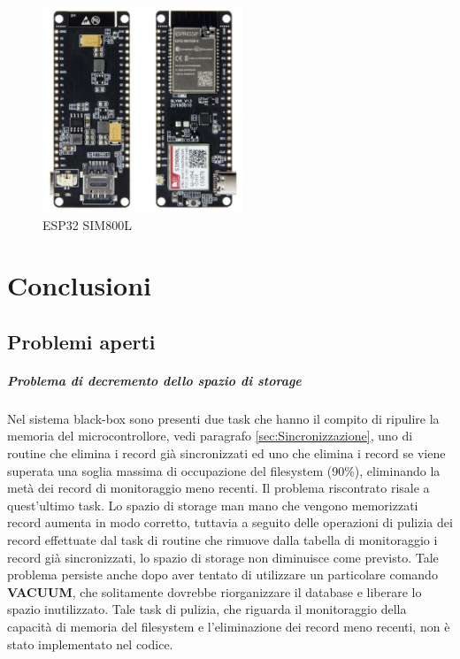 \documentclass[12pt, a4paper, italian]{report}
\numberwithin{figure}{chapter}
\numberwithin{table}{chapter}
\begin{document}
\begin{figure}[h]
  \centering
  \includegraphics[width=6cm]{esp32_gsm.png}
  \caption{ESP32 SIM800L}
  \label{fig:esp32_gsm}
\end{figure}

\chapter{Conclusioni}
\section{Problemi aperti}
\paragraph{Problema di decremento dello spazio di storage}
Nel sistema black-box sono presenti due task che hanno il compito di ripulire la memoria del microcontrollore, vedi paragrafo \ref{sec:Sincronizzazione}, uno di routine che elimina i record già sincronizzati ed uno che elimina i record se viene superata una soglia massima di occupazione del filesystem (90\%), eliminando la metà dei record di monitoraggio meno recenti. Il problema riscontrato risale a quest'ultimo task. Lo spazio di storage man mano che vengono memorizzati record aumenta in modo corretto, tuttavia a seguito delle operazioni di pulizia dei record effettuate dal task di routine che rimuove dalla tabella di monitoraggio i record già sincronizzati, lo spazio di storage non diminuisce come previsto. Tale problema persiste anche dopo aver tentato di utilizzare un particolare comando \textbf{VACUUM}, che solitamente dovrebbe riorganizzare il database e liberare lo spazio inutilizzato. 
Tale task di pulizia, che riguarda il monitoraggio della capacità di memoria del filesystem e l'eliminazione dei record meno recenti, non è stato implementato nel codice.
\end{document}
